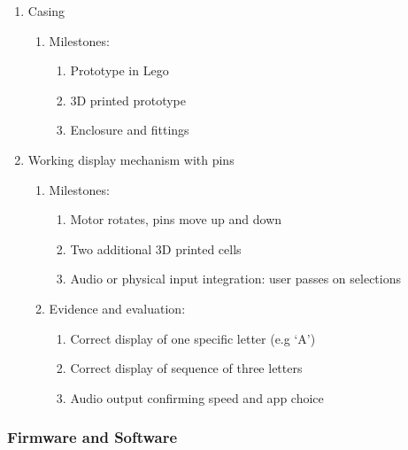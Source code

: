 \documentclass{article}
\begin{document}
\begin{enumerate}
  \item Casing
  \begin{enumerate}
    \item Milestones:
    \begin{enumerate}
      \item Prototype in Lego
      \item 3D printed prototype
      \item Enclosure and fittings
    \end{enumerate}
  \end{enumerate}
  \item Working display mechanism with pins
  \begin{enumerate}
    \item Milestones:
    \begin{enumerate}
      \item Motor rotates, pins move up and down
      \item Two additional 3D printed cells
      \item Audio or physical input integration: user passes on selections
    \end{enumerate}
    \item Evidence and evaluation:
    \begin{enumerate}
      \item Correct display of one specific letter (e.g `A')
      \item Correct display of sequence of three letters
      \item Audio output confirming speed and app choice
    \end{enumerate}
  \end{enumerate}
\end{enumerate}

\subsubsection{Firmware and Software}
\end{document}
